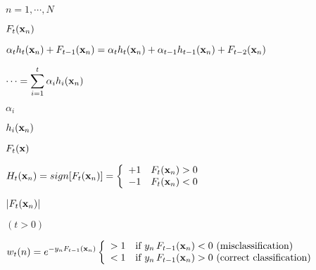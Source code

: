 \documentclass{article}
\def\lthtmlcheckvsize{\ifdim\ht\sizebox<\vsize 
  \ifdim\wd\sizebox<\hsize\expandafter\hfill\fi \expandafter\vfill
  \else\expandafter\vss\fi}%
\begin{document}
{\newpage\clearpage
{}%
$ n=1,\cdots,N$%
\lthtmlindisplaymathZ
\lthtmlcheckvsize\clearpage}

{\newpage\clearpage
{}%
$\displaystyle F_t({\bf x}_n)$%
\lthtmlindisplaymathZ
\lthtmlcheckvsize\clearpage}

{\newpage\clearpage
{}%
$\displaystyle \alpha_th_t({\bf x}_n)+F_{t-1}({\bf x}_n)
=\alpha_th_t({\bf x}_n)+\alpha_{t-1}h_{t-1}({\bf x}_n)+F_{t-2}({\bf x}_n)$%
\lthtmlindisplaymathZ
\lthtmlcheckvsize\clearpage}

{\newpage\clearpage
{}%
$\displaystyle \cdots=\sum_{i=1}^t\alpha_ih_i({\bf x}_n)$%
\lthtmlindisplaymathZ
\lthtmlcheckvsize\clearpage}

{\newpage\clearpage
{}%
$ \alpha_i$%
\lthtmlindisplaymathZ
\lthtmlcheckvsize\clearpage}

{\newpage\clearpage
{}%
$ h_i({\bf x}_n)$%
\lthtmlindisplaymathZ
\lthtmlcheckvsize\clearpage}

{\newpage\clearpage
{}%
$ F_t({\bf x})$%
\lthtmlindisplaymathZ
\lthtmlcheckvsize\clearpage}

{\newpage\clearpage
{}%
$\displaystyle H_t({\bf x}_n)=sign [F_t({\bf x}_n)]=\left\{\begin{array}{ll}
+1 & F_t({\bf x}_n)>0\\-1 & F_t({\bf x}_n)<0\end{array}\right.$%
\lthtmlindisplaymathZ
\lthtmlcheckvsize\clearpage}

{\newpage\clearpage
{}%
$ |F_t({\bf x}_n)|$%
\lthtmlindisplaymathZ
\lthtmlcheckvsize\clearpage}

{\newpage\clearpage
{}%
$ (t>0)$%
\lthtmlindisplaymathZ
\lthtmlcheckvsize\clearpage}

{\newpage\clearpage
{}%
$\displaystyle w_t(n)=e^{-y_n F_{t-1}({\bf x}_n)}\left\{\begin{array}{ll}
>1 & \mbox{if $y_n\,F_{t-1}({\bf x}_n)<0$\  (misclassification)}\\
<1 & \mbox{if $y_n\,F_{t-1}({\bf x}_n)>0$\  (correct classification)}
\end{array}\right.$%
\lthtmlindisplaymathZ
\lthtmlcheckvsize\clearpage}
\end{document}

